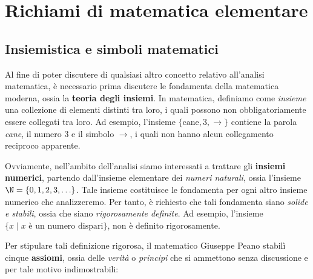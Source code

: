 \documentclass[a4paper, 12pt]{report}
\institute{\curlyquotes{\hspace{0.25mm}Sapienza} Università di Roma}
\subtitle{Appunti integrati con il libro \book}
\author{\textit{Autore}\\\authorName}
\institute{\curlyquotes{\hspace{0.25mm}Sapienza} University of Rome}
\subtitle{Lecture notes integrated with the book \book}
\author{\textit{Author}\\\authorName}
\title{\courseName}
\date{\today}
\begin{document}
    \maketitle

    {
        \hypersetup{allcolors=black}

        \romantableofcontents
    }

    \introduction

    
    \chapter{Richiami di matematica elementare}

    \section{Insiemistica e simboli matematici}

    Al fine di poter discutere di qualsiasi altro concetto relativo all'analisi matematica, è necessario prima discutere le fondamenta della matematica moderna, ossia la \textbf{teoria degli insiemi}. In matematica, definiamo come \textit{insieme} una collezione di elementi distinti tra loro, i quali possono non obbligatoriamente essere collegati tra loro. Ad esempio, l'insieme $\{\text{cane}, 3, \to\}$ contiene la parola \textit{cane}, il numero 3 e il simbolo $\to$, i quali non hanno alcun collegamento reciproco apparente.

    Ovviamente, nell'ambito dell'analisi siamo interessati a trattare gli \textbf{insiemi numerici}, partendo dall'insieme elementare dei \textit{numeri naturali}, ossia l'insieme $\N = \{0, 1, 2, 3, \ldots \}$. Tale insieme costituisce le fondamenta per ogni altro insieme numerico che analizzeremo. Per tanto, è richiesto che tali fondamenta siano \textit{solide e stabili}, ossia che siano \textit{rigorosamente definite}. Ad esempio, l'insieme $\{x \mid x \text{ è un numero dispari}\}$, non è definito rigorosamente.
    
    Per stipulare tali definizione rigorosa, il matematico Giuseppe Peano stabilì cinque \textbf{assiomi}, ossia delle \textit{verità} o \textit{principi} che si ammettono senza discussione e per tale motivo indimostrabili:
    
\end{document}
